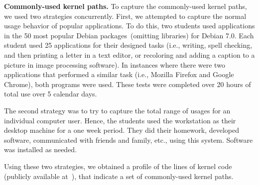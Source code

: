 \textbf{Commonly-used kernel paths.}
To capture the commonly-used kernel paths, we used two strategies concurrently.
First, we attempted to capture the normal usage behavior of popular applications.
To do this, two students used applications in the 50 most popular Debian
packages~\cite{Top-Packages}(omitting libraries) for Debian 7.0. 
Each student used 25 applications for their designed
tasks (i.e., writing, spell checking, and then printing a letter in a text
editor, or recoloring and adding a caption to a picture in image processing
software). In instances where there were two applications that performed a
similar task (i.e., Mozilla Firefox and Google Chrome), both programs were
used. These tests were completed over 20 hours of
total use over 5 calendar days.

The second strategy was to try to capture the total range of usages for an
individual computer user. Hence, the students used the workstation as their
desktop machine for a one week period. They did their homework, developed
software, communicated with friends and family, etc., using this system.
Software was installed as needed.

Using these two strategies, we obtained a profile of the lines of
kernel code (publicly available at~\cite{Lind}), that indicate
a set of commonly-used kernel paths.



